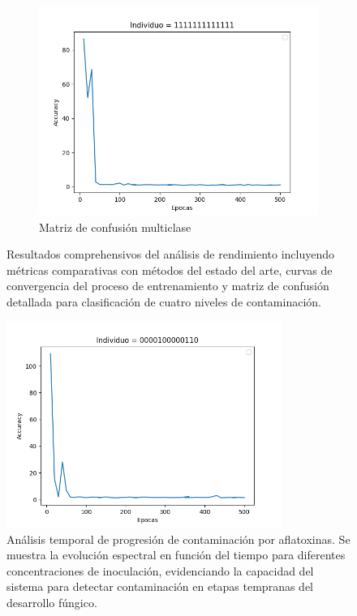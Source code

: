\begin{figure}[!ht]
\begin{subfigure}[b]{0.32\textwidth}
    \includegraphics[width=\textwidth]{images/Figure_5.png}
    \caption{Matriz de confusión multiclase}
    \label{fig:matriz_confusion}
\end{subfigure}
\caption{Resultados comprehensivos del análisis de rendimiento incluyendo métricas comparativas con métodos del estado del arte, curvas de convergencia del proceso de entrenamiento y matriz de confusión detallada para clasificación de cuatro niveles de contaminación.}
\label{fig:resultados_rendimiento_completos}
\end{figure}

\begin{figure}[!ht]
\centering
\includegraphics[width=0.8\textwidth]{images/Figure_6.png}
\caption{Análisis temporal de progresión de contaminación por aflatoxinas. Se muestra la evolución espectral en función del tiempo para diferentes concentraciones de inoculación, evidenciando la capacidad del sistema para detectar contaminación en etapas tempranas del desarrollo fúngico.}
\label{fig:evolucion_temporal_contaminacion}
\end{figure}

